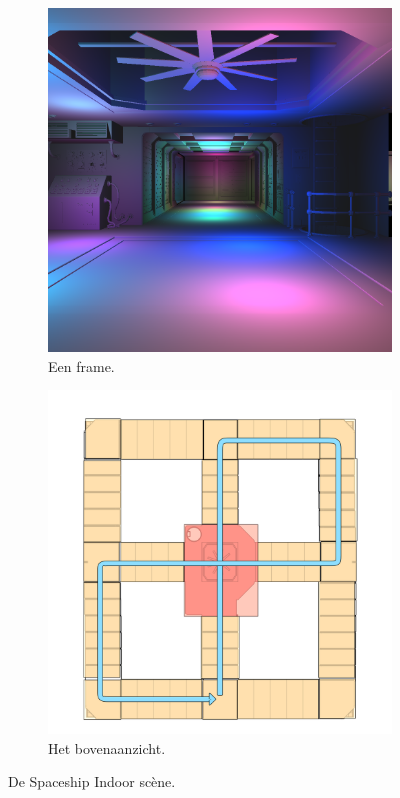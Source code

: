 \begin{figure}[tb]
  \begin{subfigure}[b]{.48\textwidth}
    \centering\includegraphics[width=\textwidth]{./img/raw/test-suite-spaceship-indoor-frame.png}
    \caption{Een frame.}
    \label{fig:test-suite-spaceship-frame}
  \end{subfigure}%
  \begin{subfigure}[b]{.51\textwidth}
    \centering\includegraphics[width=\textwidth]{./img/raw/test-suite-spaceship-indoor-map.png}
    \caption{Het bovenaanzicht.}
    \label{fig:test-suite-spaceship-map}%
  \end{subfigure}
  \caption{De Spaceship Indoor sc\`ene.}
  \label{fig:test-suite-spaceship}
\end{figure}

